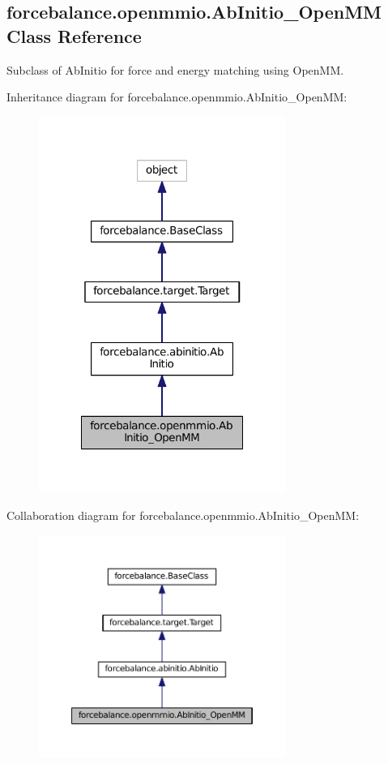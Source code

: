 \hypertarget{classforcebalance_1_1openmmio_1_1AbInitio__OpenMM}{\subsection{forcebalance.\-openmmio.\-Ab\-Initio\-\_\-\-Open\-M\-M Class Reference}
\label{classforcebalance_1_1openmmio_1_1AbInitio__OpenMM}
}


Subclass of Ab\-Initio for force and energy matching using Open\-M\-M.  




Inheritance diagram for forcebalance.\-openmmio.\-Ab\-Initio\-\_\-\-Open\-M\-M\-:
\nopagebreak
\begin{figure}[H]
\begin{center}
\leavevmode
\includegraphics[width=228pt]{classforcebalance_1_1openmmio_1_1AbInitio__OpenMM__inherit__graph}
\end{center}
\end{figure}


Collaboration diagram for forcebalance.\-openmmio.\-Ab\-Initio\-\_\-\-Open\-M\-M\-:
\nopagebreak
\begin{figure}[H]
\begin{center}
\leavevmode
\includegraphics[width=228pt]{classforcebalance_1_1openmmio_1_1AbInitio__OpenMM__coll__graph}
\end{center}
\end{figure}
